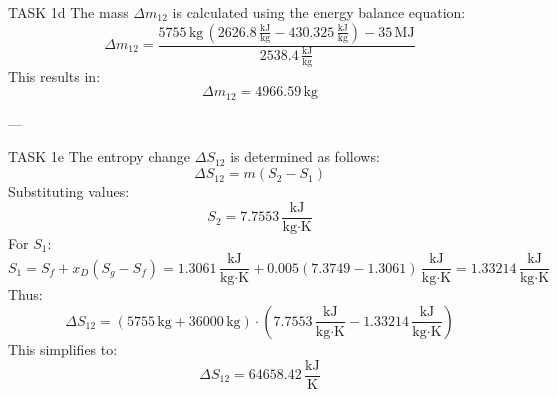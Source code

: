 TASK 1d  
The mass \( \Delta m_{12} \) is calculated using the energy balance equation:  
\[
\Delta m_{12} = \frac{5755 \, \text{kg} \, (2626.8 \, \frac{\text{kJ}}{\text{kg}} - 430.325 \, \frac{\text{kJ}}{\text{kg}}) - 35 \, \text{MJ}}{2538.4 \, \frac{\text{kJ}}{\text{kg}}}
\]  
This results in:  
\[
\Delta m_{12} = 4966.59 \, \text{kg}
\]

---

TASK 1e  
The entropy change \( \Delta S_{12} \) is determined as follows:  
\[
\Delta S_{12} = m (S_2 - S_1)
\]  
Substituting values:  
\[
S_2 = 7.7553 \, \frac{\text{kJ}}{\text{kg·K}}
\]  
For \( S_1 \):  
\[
S_1 = S_f + x_D (S_g - S_f) = 1.3061 \, \frac{\text{kJ}}{\text{kg·K}} + 0.005 (7.3749 - 1.3061) \, \frac{\text{kJ}}{\text{kg·K}} = 1.33214 \, \frac{\text{kJ}}{\text{kg·K}}
\]  
Thus:  
\[
\Delta S_{12} = (5755 \, \text{kg} + 36000 \, \text{kg}) \cdot (7.7553 \, \frac{\text{kJ}}{\text{kg·K}} - 1.33214 \, \frac{\text{kJ}}{\text{kg·K}})
\]  
This simplifies to:  
\[
\Delta S_{12} = 64658.42 \, \frac{\text{kJ}}{\text{K}}
\]